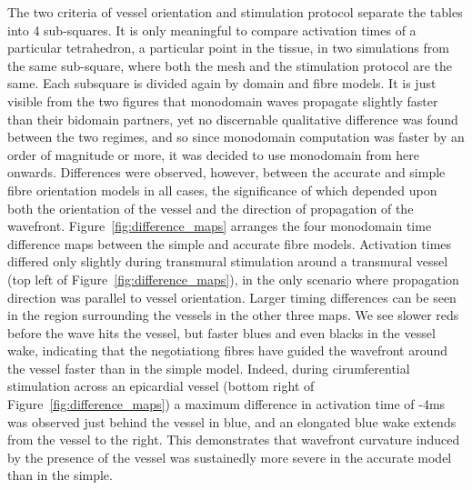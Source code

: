     The two criteria of vessel orientation and stimulation protocol separate the tables into 4 sub-squares. It is only meaningful to compare activation times of a particular tetrahedron, a particular point in the tissue, in two simulations from the same sub-square, where both the mesh and the stimulation protocol are the same. Each subsquare is divided again by domain and fibre models. It is just visible from the two figures that monodomain waves propagate slightly faster than their bidomain partners, yet no discernable qualitative difference was found between the two regimes, and so since monodomain computation was faster by an order of magnitude or more, it was decided to use monodomain from here onwards. Differences were observed, however, between the accurate and simple fibre orientation models in all cases, the significance of which depended upon both the orientation of the vessel and the direction of propagation of the wavefront. Figure~\ref{fig:difference_maps} arranges the four monodomain time difference maps between the simple and accurate fibre models. Activation times differed only slightly during transmural stimulation around a transmural vessel (top left of Figure~\ref{fig:difference_maps}), in the only scenario where propagation direction was parallel to vessel orientation. Larger timing differences can be seen in the region surrounding the vessels in the other three maps. We see slower reds before the wave hits the vessel, but faster blues and even blacks in the vessel wake, indicating that the negotiationg fibres have guided the wavefront around the vessel faster than in the simple model. Indeed, during cirumferential stimulation across an epicardial vessel (bottom right of Figure~\ref{fig:difference_maps}) a maximum difference in activation time of -4ms was observed just behind the vessel in blue, and an elongated blue wake extends from the vessel to the right. This demonstrates that wavefront curvature induced by the presence of the vessel was sustainedly more severe in the accurate model than in the simple.
    
